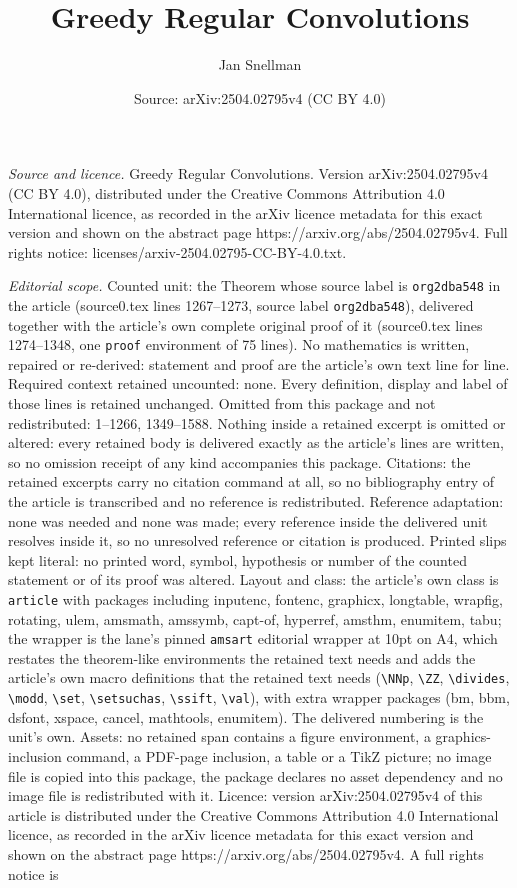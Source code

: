 \documentclass[10pt,a4paper]{amsart}
\title[Greedy Regular Convolutions]{Greedy Regular Convolutions}
\author{Jan Snellman}
\date{Source: arXiv:2504.02795v4 (CC BY 4.0)}
\begin{document}
\maketitle

\noindent\emph{Source and licence.} Greedy Regular Convolutions. Version arXiv:2504.02795v4 (CC BY 4.0), distributed under the Creative Commons Attribution 4.0 International licence, as recorded in the arXiv licence metadata for this exact version and shown on the abstract page https://arxiv.org/abs/2504.02795v4. Full rights notice: licenses/arxiv-2504.02795-CC-BY-4.0.txt.\par\smallskip

\noindent\textit{Editorial scope.} Counted unit: the Theorem whose source label is \texttt{org2dba548} in the article (source0.tex lines 1267--1273, source label \texttt{org2dba548}), delivered together with the article's own complete original proof of it (source0.tex lines 1274--1348, one \texttt{proof} environment of 75 lines). No mathematics is written, repaired or re-derived: statement and proof are the article's own text line for line. Required context retained uncounted: none. Every definition, display and label of those lines is retained unchanged. Omitted from this package and not redistributed: 1--1266, 1349--1588. Nothing inside a retained excerpt is omitted or altered: every retained body is delivered exactly as the article's lines are written, so no omission receipt of any kind accompanies this package. Citations: the retained excerpts carry no citation command at all, so no bibliography entry of the article is transcribed and no reference is redistributed. Reference adaptation: none was needed and none was made; every reference inside the delivered unit resolves inside it, so no unresolved reference or citation is produced. Printed slips kept literal: no printed word, symbol, hypothesis or number of the counted statement or of its proof was altered. Layout and class: the article's own class is \texttt{article} with packages including inputenc, fontenc, graphicx, longtable, wrapfig, rotating, ulem, amsmath, amssymb, capt-of, hyperref, amsthm, enumitem, tabu; the wrapper is the lane's pinned \texttt{amsart} editorial wrapper at 10pt on A4, which restates the theorem-like environments the retained text needs and adds the article's own macro definitions that the retained text needs (\texttt{\textbackslash NNp}, \texttt{\textbackslash ZZ}, \texttt{\textbackslash divides}, \texttt{\textbackslash modd}, \texttt{\textbackslash set}, \texttt{\textbackslash setsuchas}, \texttt{\textbackslash ssift}, \texttt{\textbackslash val}), with extra wrapper packages (bm, bbm, dsfont, xspace, cancel, mathtools, enumitem). The delivered numbering is the unit's own. Assets: no retained span contains a figure environment, a graphics-inclusion command, a PDF-page inclusion, a table or a TikZ picture; no image file is copied into this package, the package declares no asset dependency and no image file is redistributed with it. Licence: version arXiv:2504.02795v4 of this article is distributed under the Creative Commons Attribution 4.0 International licence, as recorded in the arXiv licence metadata for this exact version and shown on the abstract page https://arxiv.org/abs/2504.02795v4. A full rights notice is 
\end{document}
